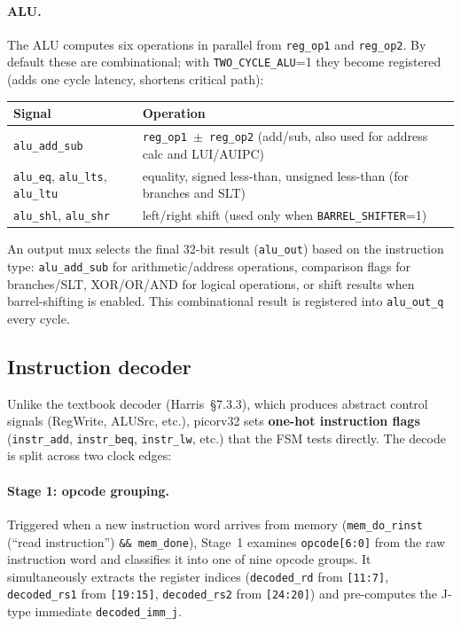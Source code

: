 \documentclass[9pt, a4paper]{extarticle}
\begin{document}
\paragraph{ALU.} The ALU computes six operations in parallel from \texttt{reg\_op1} and \texttt{reg\_op2}. By default these are combinational; with \texttt{TWO\_CYCLE\_ALU}=1 they become registered (adds one cycle latency, shortens critical path):

\begin{center}\small
\begin{tabular}{@{}l l@{}}
    \toprule
    Signal & Operation \\
    \midrule
    \texttt{alu\_add\_sub} & \texttt{reg\_op1 $\pm$ reg\_op2} (add/sub, also used for address calc and LUI/AUIPC) \\
    \texttt{alu\_eq}, \texttt{alu\_lts}, \texttt{alu\_ltu} & equality, signed less-than, unsigned less-than (for branches and SLT) \\
    \texttt{alu\_shl}, \texttt{alu\_shr} & left/right shift (used only when \texttt{BARREL\_SHIFTER}=1) \\
    \bottomrule
\end{tabular}
\end{center}

An output mux selects the final 32-bit result (\texttt{alu\_out}) based on the instruction type: \texttt{alu\_add\_sub} for arithmetic/address operations, comparison flags for branches/SLT, XOR/OR/AND for logical operations, or shift results when barrel-shifting is enabled. This combinational result is registered into \texttt{alu\_out\_q} every cycle.

\subsection{Instruction decoder}

Unlike the textbook decoder (Harris~\S7.3.3), which produces abstract control signals (RegWrite, ALUSrc, etc.), picorv32 sets \textbf{one-hot instruction flags} (\texttt{instr\_add}, \texttt{instr\_beq}, \texttt{instr\_lw}, etc.) that the FSM tests directly. The decode is split across two clock edges:

\paragraph{Stage 1: opcode grouping.} Triggered when a new instruction word arrives from memory (\texttt{mem\_do\_rinst} (``read instruction'') \texttt{\&\& mem\_done}), Stage~1 examines \texttt{opcode[6:0]} from the raw instruction word and classifies it into one of nine opcode groups. It simultaneously extracts the register indices (\texttt{decoded\_rd} from \texttt{[11:7]}, \texttt{decoded\_rs1} from \texttt{[19:15]}, \texttt{decoded\_rs2} from \texttt{[24:20]}) and pre-computes the J-type immediate \texttt{decoded\_imm\_j}.
\end{document}
